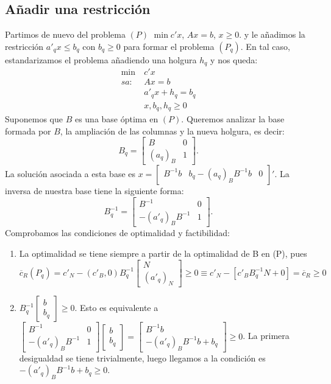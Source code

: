 \documentclass[PM.tex]{subfiles}
\begin{document}
\subsection{Añadir una restricción}
Partimos de nuevo del problema $(P)$ $\min c'x$, $Ax=b$, $x\geq 0$. y le añadimos la restricción $a'_q x\leq b_q$ con $b_q \geq 0$ para formar el problema $(P_q)$. En tal caso, estandarizamos el problema añadiendo una holgura $h_q$ y nos queda:
\begin{align*}
\min\ & c'x\\
sa:\  & Ax=b\\
& a'_q x+h_q= b_q\\
 & x, b_q, h_q\geq 0
\end{align*}
Suponemos que $B$ es una base óptima en $(P)$. Queremos analizar la base formada por $B$, la ampliación de las columnas y la nueva holgura, es decir:
\[ B_q=\begin{bmatrix}
B & 0\\
(a_q)_B & 1
\end{bmatrix}.\]
La solución asociada a esta base es $x=
\begin{bmatrix}
B^{-1}b & b_q-(a_q)_B B^{-1}b & 0\end{bmatrix}'$. La inversa de nuestra base tiene la siguiente forma:
\[ B_q^{-1}=\begin{bmatrix}
B^{-1} & 0\\
-(a'_q)_B B^{-1} & 1
\end{bmatrix}.\]
Comprobamos las condiciones de optimalidad y factibilidad:
\begin{enumerate}
\item La optimalidad se tiene siempre a partir de la optimalidad de B en (P), pues
\[\overline{c}_R(P_q)=c'_N-(c'_B,0)B_q^{-1}\begin{bmatrix}
N\\
(a'_q)_N
\end{bmatrix}\geq 0 \equiv c'_N-[c'_B B_q^{-1} N + 0]=\overline{c}_R\geq 0\]
\item $B_q^{-1}\begin{bmatrix}
b\\
b_q
\end{bmatrix}\geq 0$. Esto es equivalente a $\begin{bmatrix}
B^{-1} & 0\\
-(a'_q)_B B^{-1} & 1
\end{bmatrix}\begin{bmatrix}
b\\
b_q
\end{bmatrix}=\begin{bmatrix}
B^{-1}b\\
-(a'_q)_B B^{-1}b+b_q
\end{bmatrix}\geq 0$. La primera desigualdad se tiene trivialmente, luego llegamos a la condición es $-(a'_q)_B B^{-1}b+b_q\geq 0$.
\end{enumerate}
\end{document}
